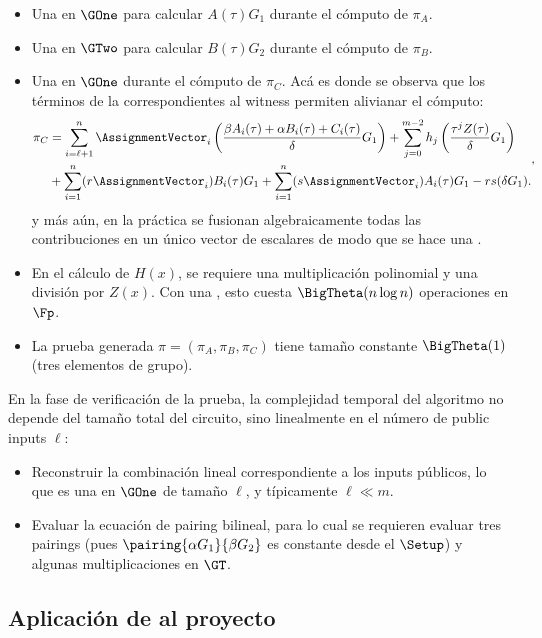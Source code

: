 \begin{itemize}[itemsep = 0.1 cm]
	\item Una \MSM en $\GOne$ para calcular $A(\tau) G_1$ durante el cómputo de $\pi_A$.
	\item Una \MSM en $\GTwo$ para calcular $B(\tau) G_2$ durante el cómputo de $\pi_B$.
	\item Una \MSM en $\GOne$ durante el cómputo de $\pi_C$. Acá es donde se observa que los términos de la \SRS correspondientes al witness permiten alivianar el cómputo:
	$$\begin{aligned}
		\pi_C &= \sum_{i=\ell+1}^{n} \AssignmentVector_i \left(\frac{\beta A_i(\tau) + \alpha B_i(\tau) + C_i(\tau)}{\delta} G_1 \right) + \sum_{j=0}^{m-2} h_j \left(\frac{\tau^j Z(\tau)}{\delta} G_1 \right) \\
		&+ \sum_{i=1}^{n} (r\AssignmentVector_i) B_i(\tau) G_1 + \sum_{i=1}^{n} (s\AssignmentVector_i) A_i(\tau) G_1 - rs(\delta G_1).
	\end{aligned},$$
	y más aún, en la práctica se fusionan algebraicamente todas las contribuciones en un único vector de escalares de modo que se hace una \MSM.
	\item En el cálculo de $H(x)$, se requiere una multiplicación polinomial y una división por $Z(x)$. Con una \FFT, esto cuesta $\BigTheta(n \log n)$ operaciones en $\Fp$.
	\item La prueba generada $\pi = (\pi_A, \pi_B, \pi_C)$ tiene tamaño constante $\BigTheta(1)$ (tres elementos de grupo).
\end{itemize}

En la fase de verificación de la prueba, la complejidad temporal del algoritmo no depende del tamaño total del circuito, sino linealmente en el número de public inputs $\ell$:

\begin{itemize}[itemsep=0.1 cm]
	\item Reconstruir la combinación lineal correspondiente a los inputs públicos, lo que es una \MSM en $\GOne$ de tamaño $\ell$, y típicamente $\ell \ll m$.
	\item Evaluar la ecuación de pairing bilineal, para lo cual se requieren evaluar tres pairings (pues $\pairing{\alpha G_1}{\beta G_2}$ es constante desde el $\Setup$) y algunas multiplicaciones en $\GT$.
\end{itemize}

\subsection{Aplicación de \Groth al proyecto}

